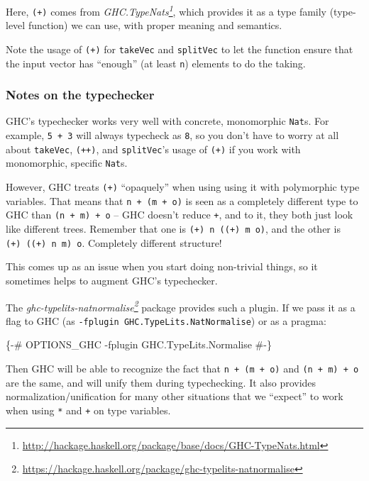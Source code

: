 \documentclass[]{article}
\newenvironment{Shaded}{}{}
\newcommand{\OtherTok}[1]{\textcolor[rgb]{0.00,0.44,0.13}{#1}}
\renewcommand{\href}[2]{#2\footnote{\url{#1}}}
\begin{document}
Here, \texttt{(+)} comes from
\emph{\href{http://hackage.haskell.org/package/base/docs/GHC-TypeNats.html}{GHC.TypeNats}},
which provides it as a type family (type-level function) we can use, with proper
meaning and semantics.

Note the usage of \texttt{(+)} for \texttt{takeVec} and \texttt{splitVec} to let
the function ensure that the input vector has ``enough'' (at least \texttt{n})
elements to do the taking.

\hypertarget{notes-on-the-typechecker}{%
\subsubsection{Notes on the typechecker}\label{notes-on-the-typechecker}}

GHC's typechecker works very well with concrete, monomorphic \texttt{Nat}s. For
example, \texttt{5\ +\ 3} will always typecheck as \texttt{8}, so you don't have
to worry at all about \texttt{takeVec}, \texttt{(++)}, and \texttt{splitVec}'s
usage of \texttt{(+)} if you work with monomorphic, specific \texttt{Nat}s.

However, GHC treats \texttt{(+)} ``opaquely'' when using using it with
polymorphic type variables. That means that \texttt{n\ +\ (m\ +\ o)} is seen as
a completely different type to GHC than \texttt{(n\ +\ m)\ +\ o} -- GHC doesn't
reduce \texttt{+}, and to it, they both just look like different trees. Remember
that one is \texttt{(+)\ n\ ((+)\ m\ o)}, and the other is
\texttt{(+)\ ((+)\ n\ m)\ o}. Completely different structure!

This comes up as an issue when you start doing non-trivial things, so it
sometimes helps to augment GHC's typechecker.

The
\emph{\href{https://hackage.haskell.org/package/ghc-typelits-natnormalise}{ghc-typelits-natnormalise}}
package provides such a plugin. If we pass it as a flag to GHC (as
\texttt{-fplugin\ GHC.TypeLits.NatNormalise}) or as a pragma:

\begin{Shaded}
\begin{Highlighting}[]
\OtherTok{\{{-}\# OPTIONS\_GHC {-}fplugin GHC.TypeLits.Normalise \#{-}\}}
\end{Highlighting}
\end{Shaded}

Then GHC will be able to recognize the fact that \texttt{n\ +\ (m\ +\ o)} and
\texttt{(n\ +\ m)\ +\ o} are the same, and will unify them during typechecking.
It also provides normalization/unification for many other situations that we
``expect'' to work when using \texttt{*} and \texttt{+} on type variables.
\end{document}
